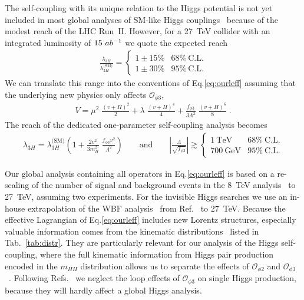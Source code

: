 The self-coupling with its unique relation to the Higgs potential is
not yet included in most global analyses of SM-like Higgs 
couplings~\cite{Ellis:2018gqa,Alves:2018nof,Biekotter:2018rhp}
because of the modest reach of the LHC Run~II.  
However, for a 27~TeV
collider with an integrated luminosity of $15~ab^{-1}$ we quote the
expected reach~\cite{Goncalves:2018yva}
%
\begin{align}
\frac{\lambda_{3H}}{\lambda_{3H}^\text{(SM)}}
=\begin{cases} 
1 \pm 15\% &  68\%~\text{C.L.} \\
1 \pm 30\% &  95\%~\text{C.L.} 
\end{cases}
\label{eq:reach_lam}
\end{align}
%
We can translate this range into the conventions of
Eq.\eqref{eq:ourleff} assuming that the underlying new physics
only affects $\mathcal{O}_{\phi 3}$,
%
\begin{align}
V = \mu^2 \; \frac{(v+H)^2}{2} 
  + \lambda \; \frac{(v+H)^4}{4} 
  + \frac{f_{\phi 3}}{3 \Lambda^2} \; \frac{(v+H)^6}{8} \; .
\end{align}
%
The reach of the dedicated one-parameter self-coupling
analysis becomes
%
\begin{align}
\lambda_{3H} 
= \lambda_{3H}^\text{(SM)}
  \left( 1 + \frac{2 v^2}{3 m_H^2} \; \frac{f_{\phi 3} v^2}{\Lambda^2} \right) 
\qquad \text{and} \qquad
\left| \frac{\Lambda}{\sqrt{f_{\phi 3}}} \right| \gtrsim
\begin{cases}
1~\text{TeV} &  68\%~\text{C.L.} \\
700~\text{GeV} &  95\%~\text{C.L.} 
\end{cases}
\label{eq:reach_d6}
\end{align}

Our global analysis containing all operators in Eq.\eqref{eq:ourleff}
is based on a re-scaling of the number of signal and background events 
in the 8~TeV analysis~\cite{Corbett:2015ksa} to 27~TeV, assuming two
experiments. For the invisible Higgs searches we use an in-house extrapolation of
the WBF analysis~\cite{Eboli:2000ze} from Ref.~\cite{Biekotter:2017gyu} to 27~TeV.  
Because the effective Lagrangian of Eq.\eqref{eq:ourleff} includes new
Lorentz structures, especially valuable information comes from the
kinematic distributions~\cite{Englert:2015hrx,Corbett:2015ksa} listed in Tab.~\ref{tab:distr}.
They are particularly relevant for our analysis of the Higgs self-coupling,
where the full kinematic information from Higgs pair production encoded in
the $m_{HH}$ distribution allows us to separate the effects of
$\mathcal{O}_{\phi 2}$ and $\mathcal{O}_{\phi  3}$~\cite{Kling:2016lay,Goncalves:2018yva}.
Following Refs.~\cite{Bizon:2016wgr,Maltoni:2017ims,DiVita:2017eyz} we neglect the loop effects
of $\mathcal{O}_{\phi 3}$ on single Higgs production, because they will
hardly affect a global Higgs analysis.  
\medskip

